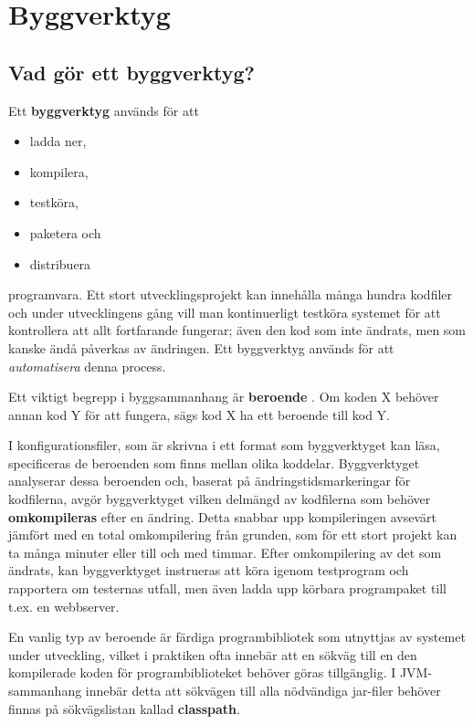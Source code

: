 
\newcommand{\sbt}{\texttt{sbt}}

\chapter{Byggverktyg}\label{appendix:build}

\section{Vad gör ett byggverktyg?}

Ett \textbf{byggverktyg}  används för att 
\begin{itemize}
\item ladda ner, 
\item kompilera, 
\item testköra, 
\item paketera och 
\item distribuera  
\end{itemize}
programvara. Ett stort utvecklingsprojekt kan innehålla många hundra kodfiler och under utvecklingens gång vill man kontinuerligt testköra systemet för att kontrollera att allt fortfarande fungerar; även den kod som inte ändrats, men som kanske ändå påverkas av ändringen. Ett byggverktyg används för att \textit{automatisera} denna process.

Ett viktigt begrepp i byggsammanhang är \textbf{beroende} . Om koden X behöver annan kod Y för att fungera, sägs kod X ha ett beroende till kod Y. 

I konfigurationsfiler, som är skrivna i ett format som byggverktyget kan läsa, specificeras de beroenden som finns mellan olika koddelar. Byggverktyget analyserar dessa beroenden och, baserat på ändringstidsmarkeringar för kodfilerna, avgör byggverktyget vilken delmängd av kodfilerna som behöver \textbf{omkompileras} efter en ändring. Detta snabbar upp kompileringen avsevärt jämfört med en total omkompilering från grunden, som för ett stort projekt kan ta många minuter eller till och med timmar. Efter omkompilering av det som ändrats, kan byggverktyget instrueras att köra igenom testprogram och rapportera om testernas utfall, men även ladda upp körbara programpaket till t.ex. en webbserver.


En vanlig typ av beroende är färdiga programbibliotek som utnyttjas av systemet under utveckling, vilket i praktiken ofta innebär att en sökväg till en den kompilerade koden för programbiblioteket behöver göras tillgänglig. I JVM-sammanhang innebär detta att sökvägen till alla nödvändiga jar-filer behöver finnas på sökvägslistan kallad \textbf{classpath}. 

